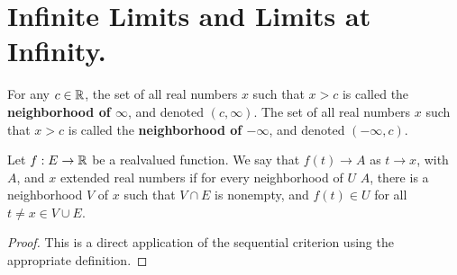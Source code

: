 
\section{Infinite Limits and Limits at Infinity.}

\begin{definition}
    For any $c \in \mathbb{R}$, the set of all real numbers $x$ such that  $x>c$ is called the
    \textbf{neighborhood of $\infty$}, and denoted $(c,\infty)$. The set of all real
    numbers $x$ such that  $x>c$ is called the \textbf{neighborhood of $-\infty$}, and
    denoted $(-\infty,c)$.
\end{definition}

\begin{definition}
    Let $f:E \rightarrow \mathbb{R}$ be a realvalued function. We say that  $f(t) \rightarrow A$ as $t \rightarrow x$, with
     $A$, and $x$ extended real numbers if for every neighborhood of $U$ $A$, there is a
     neighborhood $V$ of $x$ such that $V \cap E$ is nonempty, and $f(t) \in U$ for
     all $t \neq x \in V \cup E$.
\end{definition}

\begin{proof}
    This is a direct application of the sequential criterion using the appropriate definition.
\end{proof}
